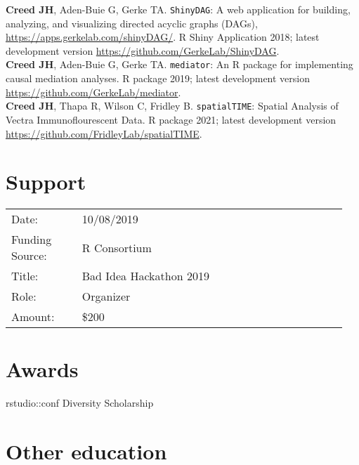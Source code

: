 \documentclass[11pt, a4paper]{article} %
\newcommand{\years}[1]{\marginnote{\scriptsize \raise .3ex\hbox{#1}}} %
\begin{document}
{\bf Creed JH}, Aden-Buie G, Gerke TA. \verb|ShinyDAG|: A web application for building, analyzing, and visualizing directed acyclic graphs (DAGs), \href{https://apps.gerkelab.com/shinyDAG/}{https://apps.gerkelab.com/shinyDAG/}. R Shiny Application 2018; latest development version \href{https://github.com/GerkeLab/ShinyDAG}{https://github.com/GerkeLab/ShinyDAG}. \\

{\bf Creed JH}, Aden-Buie G, Gerke TA. \verb|mediator|: An R package for implementing causal mediation analyses. R package 2019; latest development version \href{https://github.com/GerkeLab/mediator}{https://github.com/GerkeLab/mediator}. \\

{\bf Creed JH}, Thapa R, Wilson C, Fridley B. \verb|spatialTIME|: Spatial Analysis of Vectra Immunoflourescent Data. R package 2021; latest development version
\\\href{https://github.com/FridleyLab/spatialTIME}{https://github.com/FridleyLab/spatialTIME}. \\


\section*{Support}

\begin{longtable}{@{}p{0.2\linewidth} p{0.75\linewidth}}
Date: & 10/08/2019 \\
Funding Source: &  R Consortium \\
Title: & Bad Idea Hackathon 2019 \\
Role: & Organizer \\
Amount: & \$200 \\
\end{longtable}

\section*{Awards}

\years{2018} rstudio::conf Diversity Scholarship 


\section*{Other education}
\end{document}
